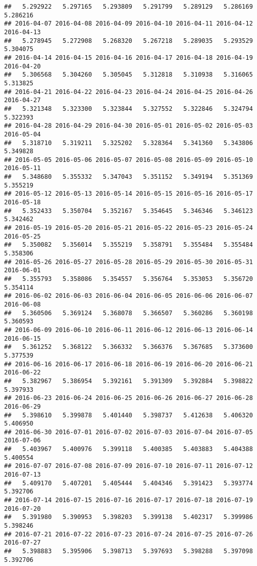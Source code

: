 \documentclass[
]{article}
\begin{document}
\begin{verbatim}
##   5.292922   5.297165   5.293809   5.291799   5.289129   5.286169   5.286216 
## 2016-04-07 2016-04-08 2016-04-09 2016-04-10 2016-04-11 2016-04-12 2016-04-13 
##   5.278945   5.272908   5.268320   5.267218   5.289035   5.293529   5.304075 
## 2016-04-14 2016-04-15 2016-04-16 2016-04-17 2016-04-18 2016-04-19 2016-04-20 
##   5.306568   5.304260   5.305045   5.312818   5.310938   5.316065   5.313825 
## 2016-04-21 2016-04-22 2016-04-23 2016-04-24 2016-04-25 2016-04-26 2016-04-27 
##   5.321348   5.323300   5.323844   5.327552   5.322846   5.324794   5.322393 
## 2016-04-28 2016-04-29 2016-04-30 2016-05-01 2016-05-02 2016-05-03 2016-05-04 
##   5.318710   5.319211   5.325202   5.328364   5.341360   5.343806   5.349828 
## 2016-05-05 2016-05-06 2016-05-07 2016-05-08 2016-05-09 2016-05-10 2016-05-11 
##   5.348680   5.355332   5.347043   5.351152   5.349194   5.351369   5.355219 
## 2016-05-12 2016-05-13 2016-05-14 2016-05-15 2016-05-16 2016-05-17 2016-05-18 
##   5.352433   5.350704   5.352167   5.354645   5.346346   5.346123   5.342462 
## 2016-05-19 2016-05-20 2016-05-21 2016-05-22 2016-05-23 2016-05-24 2016-05-25 
##   5.350082   5.356014   5.355219   5.358791   5.355484   5.355484   5.358306 
## 2016-05-26 2016-05-27 2016-05-28 2016-05-29 2016-05-30 2016-05-31 2016-06-01 
##   5.355793   5.358086   5.354557   5.356764   5.353053   5.356720   5.354114 
## 2016-06-02 2016-06-03 2016-06-04 2016-06-05 2016-06-06 2016-06-07 2016-06-08 
##   5.360506   5.369124   5.368078   5.366507   5.360286   5.360198   5.360593 
## 2016-06-09 2016-06-10 2016-06-11 2016-06-12 2016-06-13 2016-06-14 2016-06-15 
##   5.361252   5.368122   5.366332   5.366376   5.367685   5.373600   5.377539 
## 2016-06-16 2016-06-17 2016-06-18 2016-06-19 2016-06-20 2016-06-21 2016-06-22 
##   5.382967   5.386954   5.392161   5.391309   5.392884   5.398822   5.397933 
## 2016-06-23 2016-06-24 2016-06-25 2016-06-26 2016-06-27 2016-06-28 2016-06-29 
##   5.398610   5.399878   5.401440   5.398737   5.412638   5.406320   5.406950 
## 2016-06-30 2016-07-01 2016-07-02 2016-07-03 2016-07-04 2016-07-05 2016-07-06 
##   5.403967   5.400976   5.399118   5.400385   5.403883   5.404388   5.400554 
## 2016-07-07 2016-07-08 2016-07-09 2016-07-10 2016-07-11 2016-07-12 2016-07-13 
##   5.409170   5.407201   5.405444   5.404346   5.391423   5.393774   5.392706 
## 2016-07-14 2016-07-15 2016-07-16 2016-07-17 2016-07-18 2016-07-19 2016-07-20 
##   5.391980   5.390953   5.398203   5.399138   5.402317   5.399986   5.398246 
## 2016-07-21 2016-07-22 2016-07-23 2016-07-24 2016-07-25 2016-07-26 2016-07-27 
##   5.398883   5.395906   5.398713   5.397693   5.398288   5.397098   5.392706 

\end{verbatim}
\end{document}
